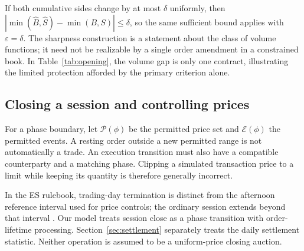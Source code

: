 If both cumulative sides change by at most $\delta$ uniformly, then $|\min(\widehat B,\widehat S)-\min(B,S)|\le\delta$, so the same sufficient bound applies with $\varepsilon=\delta$. The sharpness construction is a statement about the class of volume functions; it need not be realizable by a single order amendment in a constrained book. In Table~\ref{tab:opening}, the volume gap is only one contract, illustrating the limited protection afforded by the primary criterion alone.

\subsection{Closing a session and controlling prices}

For a phase boundary, let $\mathcal P(\phi)$ be the permitted price set and $\mathcal E(\phi)$ the permitted events. A resting order outside a new permitted range is not automatically a trade. An execution transition must also have a compatible counterparty and a matching phase. Clipping a simulated transaction price to a limit while keeping its quantity is therefore generally incorrect.

In the ES rulebook, trading-day termination is distinct from the afternoon reference interval used for price controls; the ordinary session extends beyond that interval \citep{CME358}. Our model treats session close as a phase transition with order-lifetime processing. Section~\ref{sec:settlement} separately treats the daily settlement statistic. Neither operation is assumed to be a uniform-price closing auction.
\FloatBarrier

